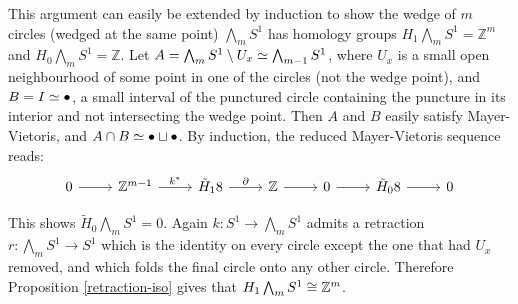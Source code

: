 \begin{example}
This argument can easily be extended by induction to show the wedge of $m$ circles (wedged at the same point) $\bigwedge_m S^1$ has homology groups $H_1\bigwedge_m S^1=\mathbb{Z}^m$ and $H_0\bigwedge_m S^1=\mathbb{Z}$. Let $A=\bigwedge_{m} S^1\setminus U_x\simeq \bigwedge_{m-1} S^1$, where $U_x$ is a small open neighbourhood of some point in one of the circles (not the wedge point), and $B=I\simeq \bullet$, a small interval of the punctured circle containing the puncture in its interior and not intersecting the wedge point. Then $A$ and $B$ easily satisfy Mayer-Vietoris, and $A\cap B\simeq \bullet \sqcup \bullet$. By induction, the reduced Mayer-Vietoris sequence reads:
\[\begin{tikzcd}
0 \arrow[r] & \mathbb{Z}^{m-1} \arrow[r, "k^*"] & \tilde{H}_18 \arrow[r, "\partial"] & \mathbb{Z} \arrow[r] & 0 \arrow[r] & \tilde{H}_08 \arrow[r] & 0
\end{tikzcd}\]

This shows $\tilde{H}_0 \bigwedge_m S^1=0$. Again  $k:S^1\rightarrow \bigwedge_m S^1$ admits a retraction $r:\bigwedge_m S^1\rightarrow S^1$ which is the identity on every circle except the one that had $U_x$ removed, and which folds the final circle onto any other circle. Therefore Proposition \ref{retraction-iso} gives that $H_1 \bigwedge_m S^1\cong \mathbb{Z}^{m}$.
\end{example}


